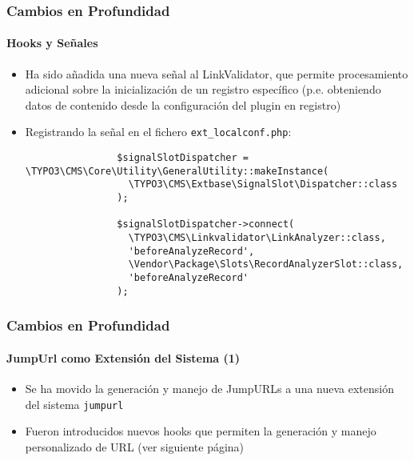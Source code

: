 \begin{frame}[fragile]
	\frametitle{Cambios en Profundidad}
	\framesubtitle{Hooks y Señales}

	\lstset{basicstyle=\tiny\ttfamily}

	\begin{itemize}

		\item Ha sido añadida una nueva señal al LinkValidator, que permite procesamiento
			adicional sobre la inicialización de un registro específico\newline
			\small
				(p.e. obteniendo datos de contenido desde la configuración del plugin en registro)
			\normalsize

		\item Registrando la señal en el fichero \texttt{ext\_localconf.php}:

			\begin{lstlisting}
				$signalSlotDispatcher = \TYPO3\CMS\Core\Utility\GeneralUtility::makeInstance(
				  \TYPO3\CMS\Extbase\SignalSlot\Dispatcher::class
				);

				$signalSlotDispatcher->connect(
				  \TYPO3\CMS\Linkvalidator\LinkAnalyzer::class,
				  'beforeAnalyzeRecord',
				  \Vendor\Package\Slots\RecordAnalyzerSlot::class,
				  'beforeAnalyzeRecord'
				);
			\end{lstlisting}

	\end{itemize}

\end{frame}


\begin{frame}[fragile]
	\frametitle{Cambios en Profundidad}
	\framesubtitle{JumpUrl como Extensión del Sistema (1)}

	\lstset{basicstyle=\tiny\ttfamily}

	\begin{itemize}

		\item Se ha movido la generación y manejo de JumpURLs a una nueva extensión del sistema \texttt{jumpurl}

		\item Fueron introducidos nuevos hooks que permiten la generación y manejo personalizado de URL (ver siguiente página)

	\end{itemize}

	\breakingchange

\end{frame}

